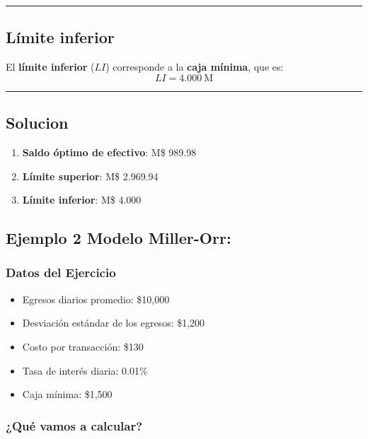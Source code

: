 \documentclass[
  letterpaper,
  DIV=11,
  numbers=noendperiod]{scrartcl}
\providecommand{\tightlist}{%
  \setlength{\itemsep}{0pt}\setlength{\parskip}{0pt}}\usepackage{longtable,booktabs,array}
\begin{document}
\begin{center}\rule{0.5\linewidth}{0.5pt}\end{center}

\subsection{Límite inferior}\label{luxedmite-inferior}

El \textbf{límite inferior} (\(LI\)) corresponde a la \textbf{caja
mínima}, que es: \[
LI = 4.000 \ \text{M}
\]

\begin{center}\rule{0.5\linewidth}{0.5pt}\end{center}

\subsection{Solucion}\label{solucion}

\begin{enumerate}
\def\labelenumi{\arabic{enumi}.}
\tightlist
\item
  \textbf{Saldo óptimo de efectivo}: M\$ 989.98
\item
  \textbf{Límite superior}: M\$ 2.969.94
\item
  \textbf{Límite inferior}: M\$ 4.000
\end{enumerate}

\subsection{Ejemplo 2 Modelo
Miller-Orr:}\label{ejemplo-2-modelo-miller-orr}

\subsubsection{Datos del Ejercicio}\label{datos-del-ejercicio}

\begin{itemize}
\tightlist
\item
  Egresos diarios promedio: \$10,000
\item
  Desviación estándar de los egresos: \$1,200
\item
  Costo por transacción: \$130
\item
  Tasa de interés diaria: 0.01\%
\item
  Caja mínima: \$1,500
\end{itemize}

\subsubsection{¿Qué vamos a calcular?}\label{quuxe9-vamos-a-calcular}
\end{document}
